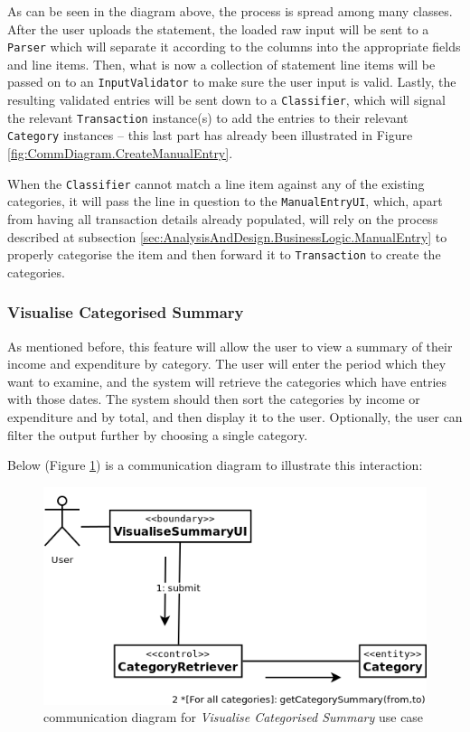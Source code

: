 As can be seen in the diagram above, the process is spread among many classes.
After the user uploads the statement, the loaded raw input will be sent to a
\texttt{Parser} which will separate it according to the columns into the
appropriate fields and line items. Then, what is now a collection of statement
line items will be passed on to an \texttt{InputValidator} to make sure the user
input is valid. Lastly, the resulting validated entries will be sent down to a
\texttt{Classifier}, which will signal the relevant \texttt{Transaction}
instance(s) to add the entries to their relevant \texttt{Category} instances --
this last part has already been illustrated in Figure
\ref{fig:CommDiagram.CreateManualEntry}. 

When the \texttt{Classifier} cannot match a line item against any of the existing
categories, it will pass the line in question to the \texttt{ManualEntryUI},
which, apart from having all transaction details already populated, will rely
on the process described at subsection \ref{sec:AnalysisAndDesign.BusinessLogic.ManualEntry}
to properly categorise the item and then forward it to \texttt{Transaction} to
create the categories.

\subsubsection{Visualise Categorised Summary} \label{sec:AnalysisAndDesign.BusinessLogic.ViewSummary}
As mentioned before, this feature will allow the user to view a summary of
their income and expenditure by category.  The user will enter the period which
they want to examine, and the system will retrieve the categories which have
entries with those dates.  The system should then sort the categories by income
or expenditure and by total, and then display it to the user. Optionally, the
user can filter the output further by choosing a single category.

Below (Figure \ref{fig:CommDiagram.VisualiseCategorisedSummary}) is a
communication diagram to illustrate this interaction: 
\begin{figure}[ht!]
  \begin{center}
    \includegraphics[width=12cm]{./contents/img/Comm_Diagram_-_Visualise_Categorised_Summary.png}
  \end{center}
  \caption{communication diagram for \emph{Visualise Categorised Summary} use case}
  \label{fig:CommDiagram.VisualiseCategorisedSummary}
\end{figure}
\FloatBarrier



